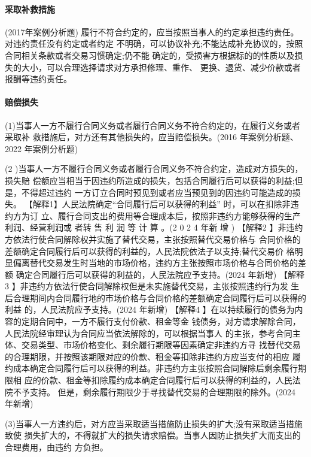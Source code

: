 \documentclass[UTF8,12pt]{ctexart}
\numberwithin{equation}{section} %
\numberwithin{figure}{section}
\numberwithin{table}{section}
\begin{document}
	\paragraph{采取补救措施}(2017年案例分析题) 履行不符合约定的，应当按照当事人的约定承担违约责任。对违约责任没有约定或者约定 不明确，可以协议补充;不能达成补充协议的，按照合同相关条款或者交易习惯确定;仍不能 确定的，受损害方根据标的的性质以及损失的大小，可以合理选择请求对方承担修理、重作、 更换、退货、减少价款或者报酬等违约责任。
	
	\paragraph{赔偿损失} 
	(1)当事人一方不履行合同义务或者履行合同义务不符合约定的，在履行义务或者采取补 救措施后，对方还有其他损失的，应当赔偿损失。(2016 年案例分析题、2022 年案例分析题) 
	
	(2 )当事人一方不履行合同义务或者履行合同义务不符合约定，造成对方损失的，损失赔 偿额应当相当于因违约所造成的损失，包括合同履行后可以获得的利益;但是，不得超过违约 一方订立合同时预见到或者应当预见到的因违约可能造成的损失。
	【解释1】人民法院确定“合同履行后可以获得的利益” 时，可以在扣除非违约方为订 立、履行合同支出的费用等合理成本后，按照非违约方能够获得的生产利润、经营利润或 者转 售 利 润 等 计 算 。(2 0 2 4 年新 增 )
	【解释2 】非违约方依法行使合同解除权并实施了替代交易，主张按照替代交易价格与 合同价格的差额确定合同履行后可以获得的利益的，人民法院依法子以支持;替代交易价 格明显偏离替代交易发生时当地的市场价格，违约方主张按照市场价格与合同价格的差额 确定合同履行后可以获得的利益的，人民法院应予支持。(2024 年新增)
	【解释3 】非违约方依法行使合同解除权但是未实施替代交易，主张按照违约行为发 生后合理期间内合同履行地的市场价格与合同价格的差额确定合同履行后可以获得的利益 的，人民法院应予支持。(2024 年新增)
	【解释4 】在以持续履行的债务为内容的定期合同中，一方不履行支付价款、租金等金 钱债务，对方请求解除合同，人民法院经审理认为合同应当依法解除的，可以根据当事人 的主张，参考合同主体、交易类型、市场价格变化、剩余履行期限等因素确定非违约方寻 找替代交易的合理期限，并按照该期限对应的价款、租金等扣除非违约方应当支付的相应 履约成本确定合同履行后可以获得的利益。非违约方主张按照合同解除后剩余履行期限相 应的价款、租金等扣除履约成本确定合同履行后可以获得的利益的，人民法院不予支持。 但是，剩余履行期限少于寻找替代交易的合理期限的除外。(2024 年新增)
	
	(3)当事人一方违约后，对方应当采取适当措施防止损失的扩大;没有采取适当措施致使 损失扩大的，不得就扩大的损失请求赔偿。当事人因防止损失扩大而支出的合理费用，由违约 方负担。
	
\end{document}
